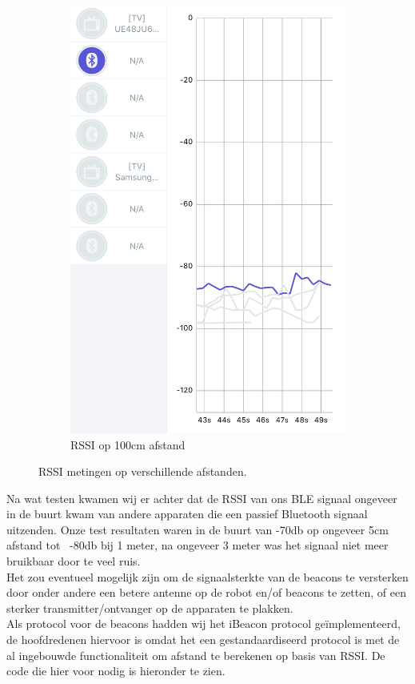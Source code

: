 \begin{figure}[H]
\begin{subfigure}{0.5\textwidth}
        \includegraphics[width=0.8\linewidth]{img/rssi_100cm_small.png} 
        \caption{RSSI op 100cm afstand}
        \label{fig:rssi_meting_100cm}
    \end{subfigure}
    \caption{RSSI metingen op verschillende afstanden.}
    \label{fig:RSSI_meting}
\end{figure}

Na wat testen kwamen wij er achter dat de RSSI van ons BLE signaal ongeveer in de buurt kwam van andere apparaten die een passief Bluetooth signaal uitzenden. Onze test resultaten waren in de buurt van -70db op ongeveer 5cm afstand tot ~-80db bij 1 meter, na ongeveer 3 meter was het signaal niet meer bruikbaar door te veel ruis. \\

Het zou eventueel mogelijk zijn om de signaalsterkte van de beacons te versterken door onder andere een betere antenne op de robot en/of beacons te zetten, of een sterker transmitter/ontvanger op de apparaten te plakken.\\

Als protocol voor de beacons hadden wij het iBeacon protocol geïmplementeerd, de hoofdredenen hiervoor is omdat het een gestandaardiseerd protocol is met de al ingebouwde functionaliteit om afstand te berekenen op basis van RSSI. De code die hier voor nodig is hieronder te zien. \\

